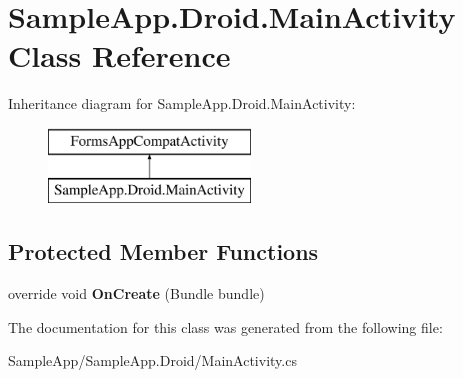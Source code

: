 \hypertarget{class_sample_app_1_1_droid_1_1_main_activity}{}\section{Sample\+App.\+Droid.\+Main\+Activity Class Reference}
\label{class_sample_app_1_1_droid_1_1_main_activity}
Inheritance diagram for Sample\+App.\+Droid.\+Main\+Activity\+:\begin{figure}[H]
\begin{center}
\leavevmode
\includegraphics[height=2.000000cm]{class_sample_app_1_1_droid_1_1_main_activity}
\end{center}
\end{figure}
\subsection*{Protected Member Functions}
\begin{DoxyCompactItemize}
\item 
\mbox{\label{class_sample_app_1_1_droid_1_1_main_activity_a2bcd041477b2bace65e27bec2e42dc1c}} 
override void {\bfseries On\+Create} (Bundle bundle)
\end{DoxyCompactItemize}


The documentation for this class was generated from the following file\+:\begin{DoxyCompactItemize}
\item 
Sample\+App/\+Sample\+App.\+Droid/Main\+Activity.\+cs\end{DoxyCompactItemize}
